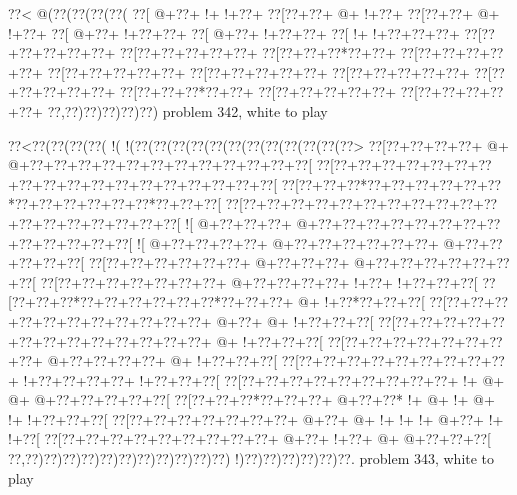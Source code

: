 \vbox{\vbox{\goo
\0??<\- @(\0??(\0??(\0??(\0??(
\0??[\- @+\0??+\- !+\- !+\0??+
\0??[\0??+\0??+\- @+\- !+\0??+
\0??[\0??+\0??+\- @+\- !+\0??+
\0??[\- @+\0??+\- !+\0??+\0??+
\0??[\- @+\0??+\- !+\0??+\0??+
\0??[\- !+\- !+\0??+\0??+\0??+
\0??[\0??+\0??+\0??+\0??+\0??+
\0??[\0??+\0??+\0??+\0??+\0??+
\0??[\0??+\0??+\0??*\0??+\0??+
\0??[\0??+\0??+\0??+\0??+\0??+
\0??[\0??+\0??+\0??+\0??+\0??+
\0??[\0??+\0??+\0??+\0??+\0??+
\0??[\0??+\0??+\0??+\0??+\0??+
\0??[\0??+\0??+\0??+\0??+\0??+
\0??[\0??+\0??+\0??*\0??+\0??+
\0??[\0??+\0??+\0??+\0??+\0??+
\0??[\0??+\0??+\0??+\0??+\0??+
\0??,\0??)\0??)\0??)\0??)\0??)
}
\hfil problem 342, white to play\hfil\break
}

\vbox{\vbox{\goo
\0??<\0??(\0??(\0??(\0??(\- !(\- !(\0??(\0??(\0??(\0??(\0??(\0??(\0??(\0??(\0??(\0??(\0??(\0??>
\0??[\0??+\0??+\0??+\0??+\- @+\- @+\0??+\0??+\0??+\0??+\0??+\0??+\0??+\0??+\0??+\0??+\0??+\0??[
\0??[\0??+\0??+\0??+\0??+\0??+\0??+\0??+\0??+\0??+\0??+\0??+\0??+\0??+\0??+\0??+\0??+\0??+\0??[
\0??[\0??+\0??+\0??*\0??+\0??+\0??+\0??+\0??+\0??*\0??+\0??+\0??+\0??+\0??+\0??*\0??+\0??+\0??[
\0??[\0??+\0??+\0??+\0??+\0??+\0??+\0??+\0??+\0??+\0??+\0??+\0??+\0??+\0??+\0??+\0??+\0??+\0??[
\- ![\- @+\0??+\0??+\0??+\- @+\0??+\0??+\0??+\0??+\0??+\0??+\0??+\0??+\0??+\0??+\0??+\0??+\0??[
\- ![\- @+\0??+\0??+\0??+\0??+\- @+\0??+\0??+\0??+\0??+\0??+\0??+\- @+\0??+\0??+\0??+\0??+\0??[
\0??[\0??+\0??+\0??+\0??+\0??+\0??+\- @+\0??+\0??+\0??+\- @+\0??+\0??+\0??+\0??+\0??+\0??+\0??[
\0??[\0??+\0??+\0??+\0??+\0??+\0??+\0??+\- @+\0??+\0??+\0??+\0??+\- !+\0??+\- !+\0??+\0??+\0??[
\0??[\0??+\0??+\0??*\0??+\0??+\0??+\0??+\0??+\0??*\0??+\0??+\0??+\- @+\- !+\0??*\0??+\0??+\0??[
\0??[\0??+\0??+\0??+\0??+\0??+\0??+\0??+\0??+\0??+\0??+\0??+\- @+\0??+\- @+\- !+\0??+\0??+\0??[
\0??[\0??+\0??+\0??+\0??+\0??+\0??+\0??+\0??+\0??+\0??+\0??+\0??+\0??+\- @+\- !+\0??+\0??+\0??[
\0??[\0??+\0??+\0??+\0??+\0??+\0??+\0??+\0??+\- @+\0??+\0??+\0??+\0??+\- @+\- !+\0??+\0??+\0??[
\0??[\0??+\0??+\0??+\0??+\0??+\0??+\0??+\0??+\0??+\- !+\0??+\0??+\0??+\0??+\- !+\0??+\0??+\0??[
\0??[\0??+\0??+\0??+\0??+\0??+\0??+\0??+\0??+\0??+\- !+\- @+\- @+\- @+\0??+\0??+\0??+\0??+\0??[
\0??[\0??+\0??+\0??*\0??+\0??+\0??+\- @+\0??+\0??*\- !+\- @+\- !+\- @+\- !+\- !+\0??+\0??+\0??[
\0??[\0??+\0??+\0??+\0??+\0??+\0??+\0??+\- @+\0??+\- @+\- !+\- !+\- !+\- @+\0??+\- !+\- !+\0??[
\0??[\0??+\0??+\0??+\0??+\0??+\0??+\0??+\0??+\0??+\- @+\0??+\- !+\0??+\- @+\- @+\0??+\0??+\0??[
\0??,\0??)\0??)\0??)\0??)\0??)\0??)\0??)\0??)\0??)\0??)\0??)\- !)\0??)\0??)\0??)\0??)\0??)\0??.
}
\hfil problem 343, white to play\hfil\break
}

